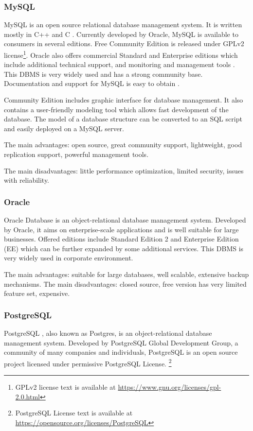 		\subsubsection*{MySQL}
		MySQL \cite{mysql} is an open source relational database management system. It is written mostly in C++ and C \cite{mysqllanguage}.  Currently developed by Oracle, MySQL is available to consumers in several editions. Free Community Edition is released under GPLv2 license\footnote{GPLv2 license text is available at \url{https://www.gnu.org/licenses/gpl-2.0.html}}. Oracle also offers commercial Standard and Enterprise editions which include additional technical support, and monitoring and management tools \cite{mysqleditions}. This DBMS is very widely used and has a strong community base. Documentation and support for MySQL is easy to obtain \cite{mysqlbook}. 
		
		Community Edition includes graphic interface for database management. It also contains a user-friendly modeling tool which allows fast development of the database. The model of a database structure can be converted to an SQL script and easily deployed on a MySQL server.
		
		The main advantages: open source, great community support, lightweight, good replication support, powerful management tools.
		
		The main disadvantages: little performance optimization, limited security,  issues with reliability.
		
		\subsubsection*{Oracle}
		Oracle Database \cite{oracledb} is an object-relational database management system. Developed by Oracle, it aims on enterprise-scale applications and is well suitable for large businesses. Offered editions include Standard Edition 2 and Enterprise Edition (EE) which can be further expanded by some additional services. This DBMS is very widely used in corporate environment.
		
		The main advantages: suitable for large databases, well scalable, extensive backup mechanisms.
		The main disadvantages: closed source, free version has very limited feature set, expensive.
		 
		\subsubsection*{PostgreSQL}
		PostgreSQL \cite{postgres}, also known as Postgres, is an object-relational database management system. Developed by PostgreSQL Global Development Group, a community of many companies and individuals, PostgreSQL is an open source project licensed under permissive PostgreSQL License. \footnote{PostgreSQL License text is available at \url{https://opensource.org/licenses/PostgreSQL}}
		

